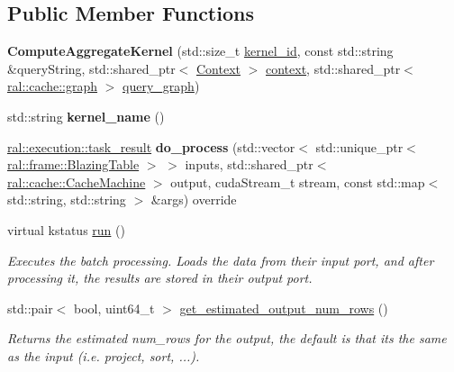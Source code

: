 \subsection*{Public Member Functions}
\begin{DoxyCompactItemize}
\item 
\mbox{\label{classral_1_1batch_1_1ComputeAggregateKernel_aa4be3582ee2fd8ac7af27261ec3ddc24}} 
{\bfseries Compute\+Aggregate\+Kernel} (std\+::size\+\_\+t \hyperlink{classral_1_1cache_1_1kernel_a2fd708656cb056a41ec635b8bdc4acfe}{kernel\+\_\+id}, const std\+::string \&query\+String, std\+::shared\+\_\+ptr$<$ \hyperlink{classblazingdb_1_1manager_1_1Context}{Context} $>$ \hyperlink{classral_1_1cache_1_1kernel_af0347d14d678cfa7205c1387746a2e1b}{context}, std\+::shared\+\_\+ptr$<$ \hyperlink{classral_1_1cache_1_1graph}{ral\+::cache\+::graph} $>$ \hyperlink{classral_1_1cache_1_1kernel_a5fbb02292aff165a28ef25e75f0d89bd}{query\+\_\+graph})
\item 
\mbox{\label{classral_1_1batch_1_1ComputeAggregateKernel_a70d6e3a23667950c3caa1ead353ef878}} 
std\+::string {\bfseries kernel\+\_\+name} ()
\item 
\mbox{\label{classral_1_1batch_1_1ComputeAggregateKernel_afa8069e21f3ad90f597e00c59ac064cd}} 
\hyperlink{structral_1_1execution_1_1task__result}{ral\+::execution\+::task\+\_\+result} {\bfseries do\+\_\+process} (std\+::vector$<$ std\+::unique\+\_\+ptr$<$ \hyperlink{classral_1_1frame_1_1BlazingTable}{ral\+::frame\+::\+Blazing\+Table} $>$ $>$ inputs, std\+::shared\+\_\+ptr$<$ \hyperlink{classral_1_1cache_1_1CacheMachine}{ral\+::cache\+::\+Cache\+Machine} $>$ output, cuda\+Stream\+\_\+t stream, const std\+::map$<$ std\+::string, std\+::string $>$ \&args) override
\item 
virtual kstatus \hyperlink{classral_1_1batch_1_1ComputeAggregateKernel_ad3f8e41cf0adf95dbe0249a6dd9c1240}{run} ()
\begin{DoxyCompactList}\small\item\em Executes the batch processing. Loads the data from their input port, and after processing it, the results are stored in their output port. \end{DoxyCompactList}\item 
\mbox{\label{classral_1_1batch_1_1ComputeAggregateKernel_a08af1468040c590da06edee88cf92f2e}} 
std\+::pair$<$ bool, uint64\+\_\+t $>$ \hyperlink{classral_1_1batch_1_1ComputeAggregateKernel_a08af1468040c590da06edee88cf92f2e}{get\+\_\+estimated\+\_\+output\+\_\+num\+\_\+rows} ()
\begin{DoxyCompactList}\small\item\em Returns the estimated num\+\_\+rows for the output, the default is that its the same as the input (i.\+e. project, sort, ...). \end{DoxyCompactList}\end{DoxyCompactItemize}
